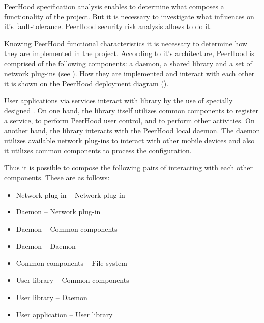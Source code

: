%
PeerHood specification analysis enables to determine what composes a functionality of the project. 
%
But it is necessary to investigate what influences on it's fault-tolerance. 
%
PeerHood security risk analysis allows to do it. 

%
Knowing PeerHood functional characteristics it is necessary to determine how they are implemented in the project. 
%
According to it's architecture, PeerHood is comprised of the following components: a daemon, a shared library and a set of network plug-ins (see ). 
%
How they are implemented and interact with each other it is shown on the PeerHood deployment diagram (). 


%
User applications via services interact with library by the use of specially designed . 
%
On one hand, the library itself utilizes common components to register a service, to perform PeerHood user control, and to perform other activities. 
%
On another hand, the library interacts with the PeerHood local daemon. 
%
The daemon utilizes available network plug-ins to interact with other mobile devices and also it utilizes common components to process the configuration. 

%
Thus it is possible to compose the following pairs of interacting with each other components. 
%
These are as follows: 
\begin{itemize}
	\setlength{\itemsep}{0pt}%

	\item Network plug-in -- Network plug-in
	\item Daemon -- Network plug-in
	\item Daemon -- Common components
	\item Daemon -- Daemon
	\item Common components -- File system
	\item User library -- Common components
	\item User library -- Daemon
	\item User application -- User library
\end{itemize}

